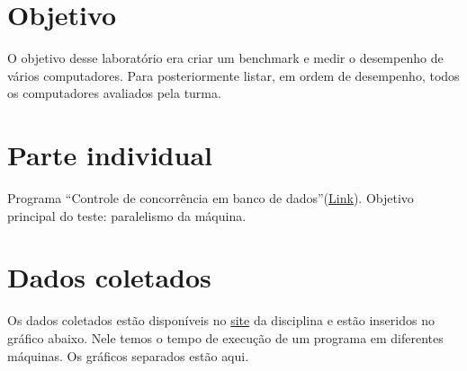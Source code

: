 \documentclass[10pt,a4paper]{article}
\begin{document}
\setlength{\parskip}{0pt}
\setlength{\parsep}{0pt}
\setlength{\headsep}{0pt}
\setlength{\topskip}{0pt}
\setlength{\topmargin}{0pt}
\setlength{\topsep}{0pt}
\setlength{\partopsep}{0pt}


\begin{minipage}{5cm}
  \vspace{2mm}
\end{minipage}


\section{Objetivo}
O objetivo desse laboratório era criar um benchmark e medir o desempenho de vários computadores.
Para posteriormente listar, em ordem de desempenho, todos os computadores avaliados pela turma.
\section{Parte individual}
Programa ``Controle de concorrência em banco de
dados''(\href{http://tinyurl.com/4kek6xs}{Link}). Objetivo principal
do teste: paralelismo da máquina.
\section{Dados coletados}
Os dados coletados estão disponíveis no \href{http://tinyurl.com/4kaohe3}{site} da
disciplina e estão inseridos no gráfico abaixo. Nele
temos o tempo de execução de um programa em diferentes máquinas. Os
gráficos separados estão aqui.
\end{document}
